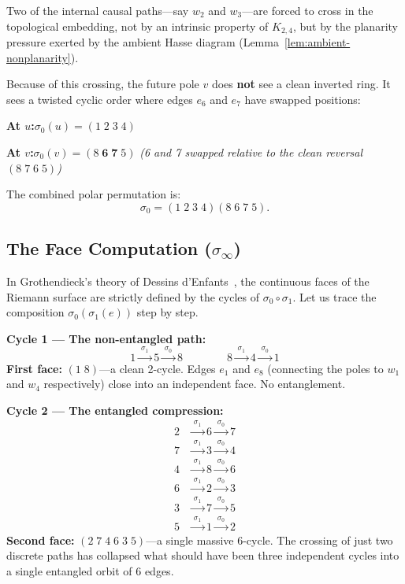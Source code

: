 Two of the internal causal paths---say $w_2$ and $w_3$---are
forced to cross in the topological embedding, not by an
intrinsic property of $K_{2,4}$, but by the planarity pressure
exerted by the ambient Hasse diagram
(Lemma~\ref{lem:ambient-nonplanarity}).

Because of this crossing, the future pole $v$ does \textbf{not} see a clean
inverted ring. It sees a twisted cyclic order where edges
$e_6$ and $e_7$ have swapped positions:

\medskip
\noindent
\textbf{At $u$:}\quad $\sigma_0(u) = (1\;2\;3\;4)$

\noindent
\textbf{At $v$:}\quad $\sigma_0(v) = (8\;\mathbf{6\;7}\;5)$
\quad\textit{(6 and 7 swapped relative to the clean reversal
$(8\;7\;6\;5)$)}

\medskip
\noindent
The combined polar permutation is:
\[
  \sigma_0 = (1\;2\;3\;4)(8\;6\;7\;5).
\]

\subsection{The Face Computation ($\sigma_\infty$)}

In Grothendieck's theory of Dessins d'Enfants~\cite{grothendieck1984},
the continuous faces of the Riemann surface are strictly defined by the
cycles of $\sigma_0 \circ \sigma_1$. Let us trace the composition
$\sigma_0(\sigma_1(e))$ step by step.

\medskip
\noindent
\textbf{Cycle 1 --- The non-entangled path:}
\[
  1 \xrightarrow{\;\sigma_1\;} 5 \xrightarrow{\;\sigma_0\;} 8
  \qquad\qquad
  8 \xrightarrow{\;\sigma_1\;} 4 \xrightarrow{\;\sigma_0\;} 1
\]
\textbf{First face:} $(1\;8)$---a clean 2-cycle. Edges $e_1$
and $e_8$ (connecting the poles to $w_1$ and $w_4$ respectively)
close into an independent face. No entanglement.

\medskip
\noindent
\textbf{Cycle 2 --- The entangled compression:}
\begin{align*}
  2 &\xrightarrow{\;\sigma_1\;} 6 \xrightarrow{\;\sigma_0\;} 7 \\
  7 &\xrightarrow{\;\sigma_1\;} 3 \xrightarrow{\;\sigma_0\;} 4 \\
  4 &\xrightarrow{\;\sigma_1\;} 8 \xrightarrow{\;\sigma_0\;} 6 \\
  6 &\xrightarrow{\;\sigma_1\;} 2 \xrightarrow{\;\sigma_0\;} 3 \\
  3 &\xrightarrow{\;\sigma_1\;} 7 \xrightarrow{\;\sigma_0\;} 5 \\
  5 &\xrightarrow{\;\sigma_1\;} 1 \xrightarrow{\;\sigma_0\;} 2
\end{align*}
\textbf{Second face:} $(2\;7\;4\;6\;3\;5)$---a single massive
6-cycle. The crossing of just two discrete paths has collapsed what
should have been three independent cycles into a single entangled
orbit of 6 edges.

